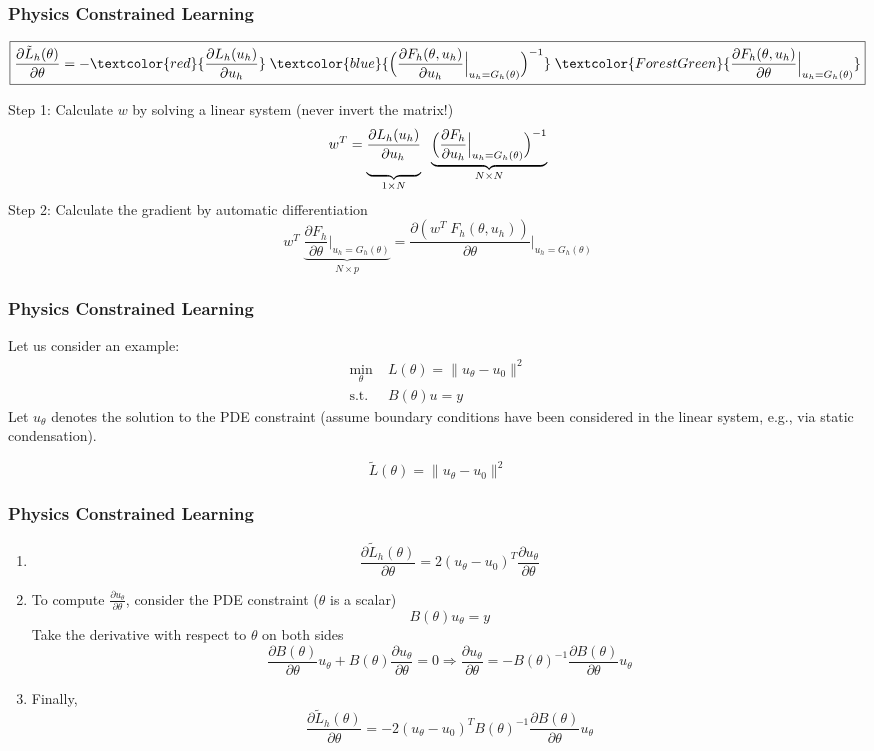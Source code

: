 \documentclass[usenames,dvipsnames]{beamer}
\begin{document}
\begin{frame}
	\frametitle{Physics Constrained Learning}
	{\scriptsize$$\boxed{\frac{{\partial {{\tilde L}_h}(\theta )}}{{\partial \theta }}
		= - \textcolor{red}{ \frac{{\partial {L_h}({u_h})}}{{\partial {u_h}}} } \;
		\textcolor{blue}{ \Big( {\frac{{\partial {F_h(\theta, u_h)}}}{{\partial {u_h}}}\Big|_{u_h = {G_h}(\theta )}} \Big)^{ - 1} } \;
		\textcolor{ForestGreen}{ \frac{{\partial {F_h(\theta, u_h)}}}{{\partial \theta }}\Big|_{u_h = {G_h}(\theta )} }
		}$$}

	Step 1: Calculate $w$ by solving a linear system (never invert the matrix!)
	{\scriptsize$$w^T = \underbrace{\frac{{\partial {L_h}({u_h})}}{{\partial {u_h}}\rule[-9pt]{1pt}{0pt}}}_{1\times N}
		\;\;
		\underbrace{\Big( {\frac{{\partial {F_h}}}{{\partial {u_h}}}\Big|_{u_h = {G_h}(\theta )}} \Big)^{ - 1}}_{N\times N}$$}
	Step 2: Calculate the gradient by automatic differentiation
	{\scriptsize$$w^T\;\underbrace{\frac{{\partial {F_h}}}{{\partial \theta }}\Big|_{u_h = {G_h}(\theta )}}_{N\times p} = \frac{\partial (w^T\;  {F_h}(\theta, u_h))}{\partial \theta }\Bigg|_{u_h = {G_h}(\theta )}$$}

\end{frame}


\begin{frame}
	\frametitle{Physics Constrained Learning}
	Let us consider an example:
\begin{equation}
  \begin{aligned}
	\min_\theta & \; L(\theta) = \|u_\theta - u_0\|^2 \\ 
	\mbox{s.t.} & \; B(\theta)u = y
\end{aligned}	
\end{equation}
Let $u_\theta$ denotes the solution to the PDE constraint (assume boundary conditions have been considered in the linear system, e.g., via static condensation). 

$$\tilde L(\theta) = \|u_\theta - u_0\|^2$$
\end{frame}

\begin{frame}
	\frametitle{Physics Constrained Learning}
	\begin{enumerate}
		\item 
		$$\frac{\partial \tilde L_h(\theta)}{\partial \theta} = 2(u_\theta-u_0)^T \frac{\partial u_\theta}{\partial \theta}$$
\item To compute $\frac{\partial u_\theta}{\partial \theta}$, consider the PDE constraint ($\theta$ is a scalar)
$$B(\theta) u_\theta = y$$
Take the derivative with respect to $\theta$ on both sides 
$$\frac{\partial B(\theta)}{\partial \theta}u_\theta + B(\theta) \frac{\partial u_\theta}{\partial \theta} = 0\Rightarrow \frac{\partial u_\theta}{\partial \theta} = -B(\theta)^{-1} \frac{\partial B(\theta)}{\partial \theta}u_\theta$$
\item Finally, 
$$\frac{\partial \tilde L_h(\theta)}{\partial \theta} = -2(u_\theta-u_0)^TB(\theta)^{-1} \frac{\partial B(\theta)}{\partial \theta}u_\theta$$
	\end{enumerate}
\end{frame}
\end{document}
